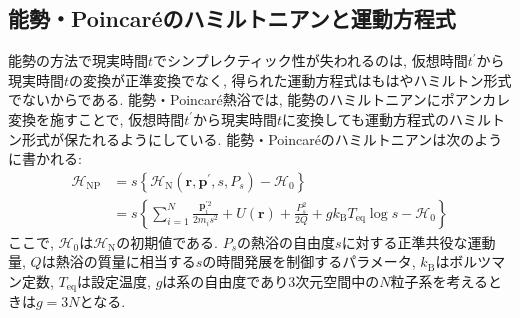 \subsection{能勢・Poincar\'{e}のハミルトニアンと運動方程式}
能勢の方法で現実時間$t$でシンプレクティック性が失われるのは, 仮想時間$t^{\prime}$から現実時間$t$の変換が正準変換でなく, 得られた運動方程式はもはやハミルトン形式でないからである. 能勢・Poincar\'{e}熱浴では, 能勢のハミルトニアンにポアンカレ変換\cite{Okazaki2011}を施すことで, 仮想時間$t^{\prime}$から現実時間$t$に変換しても運動方程式のハミルトン形式が保たれるようにしている.
能勢・Poincar\'{e}のハミルトニアンは次のように書かれる:
\begin{align}
  \mathcal{H}_{\mathrm{NP}}
  &=
  s
  \left\{
    \mathcal{H}_{\mathrm{N}}(\bm{r}, \bm{p}^{\prime}, s, P_{s}) - \mathcal{H}_{0}
  \right\}
  \\
  &=
  s
  \left\{
    \sum_{i=1}^{N}
    \frac{\bm{p}_{i}^{\prime 2}}{2m_{i}s^{2}}
    + U(\bm{r})
    +
    \frac{P_{s}^{2}}{2Q}
    +
    g k_{\mathrm{B}} T_{\mathrm{eq}} \log s
    - \mathcal{H}_{0}
  \right\}
  \label{Eq:Hamiltonian-Nose-Poincare}
\end{align}
ここで, $\mathcal{H}_{0}$は$\mathcal{H}_{\mathrm{N}}$の初期値である. $P_{s}$の熱浴の自由度$s$に対する正準共役な運動量, $Q$は熱浴の質量に相当する$s$の時間発展を制御するパラメータ, $k_{\mathrm{B}}$はボルツマン定数, $T_{\mathrm{eq}}$は設定温度, $g$は系の自由度であり3次元空間中の$N$粒子系を考えるときは$g=3N$となる.

